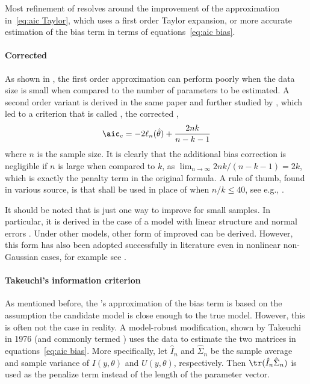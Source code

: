 Most refinement of \aic resolves around the improvement of the approximation
in~\eqref{eq:aic Taylor}, which uses a first order Taylor expansion, or more
accurate estimation of the bias term in terms of equations~\eqref{eq:aic
  bias}.

\paragraph{Corrected \protect\aic}

As shown in \cite{Sugiura:1978be}, the first order approximation can perform
poorly when the data size is small when compared to the number of parameters
to be estimated. A second order variant is derived in the same paper and
further studied by \cite{Hurvich:1989ev}, which led to a criterion that is
called \aicc, the corrected \aic,
\begin{equation}
  \text{\aicc} = -2\ell_n(\hat\theta) + \frac{2nk}{n-k-1}
\end{equation}
where $n$ is the sample size. It is clearly that the additional bias
correction is negligible if $n$ is large when compared to $k$, as
$\lim_{n\to\infty}2nk/(n-k-1) = 2k$, which is exactly the penalty term in the
original \aic formula. A rule of thumb, found in various source, is that \aicc
shall be used in place of \aic when $n/k\le40$, see e.g.,
\cite[][sec.~2.4]{Burnham:2002wc}.

It should be noted that \aicc is just one way to improve \aic for small
samples. In particular, it is derived in the case of a model with linear
structure and normal errors \cite{Hurvich:1989ev, Burnham:2002wc}. Under other
models, other form of improved \aic can be derived. However, this form has
also been adopted successfully in literature even in nonlinear non-Gaussian
cases, for example see \cite{Turkheimer:2003iy}.

\paragraph{Takeuchi's information criterion}

As mentioned before, the \aic's approximation of the bias term is based on the
assumption the candidate model is close enough to the true model. However,
this is often not the case in reality. A model-robust modification, shown by
Takeuchi in 1976 (and commonly termed \tic) uses the data to estimate the two
matrices in equations~\eqref{eq:aic bias}. More specifically, let $\hat{I}_n$
and $\hat\Sigma_n$ be the sample average and sample variance of $I(y,\theta)$
and $U(y,\theta)$, respectively. Then $\tr(\hat{I}_n\hat\Sigma_n)$ is used as
the penalize term instead of the length of the parameter vector.

